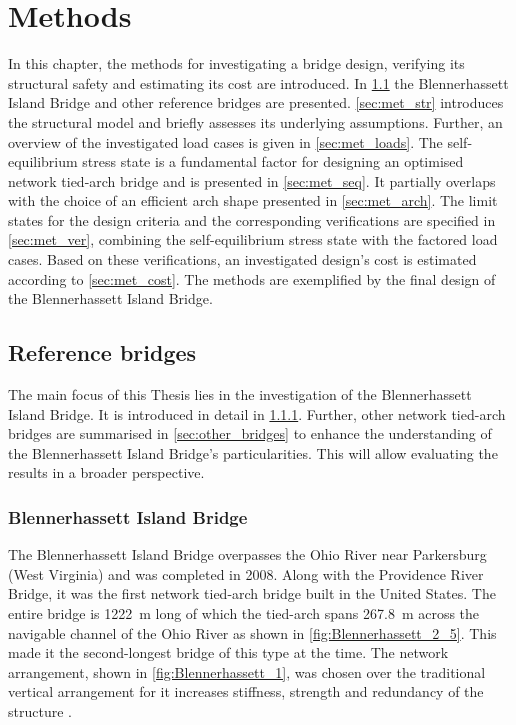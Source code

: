 \chapter{Methods}\label{sec:methods}
In this chapter, the methods for investigating a bridge design, verifying its structural safety and estimating its cost are introduced. In \cref{sec:met_ref} the Blennerhassett Island Bridge and other reference bridges are presented.
\cref{sec:met_str} introduces the structural model and briefly assesses its underlying assumptions. 
Further, an overview of the investigated load cases is given in \cref{sec:met_loads}. 
The self-equilibrium stress state is a fundamental factor for designing an optimised network tied-arch bridge and is presented in \cref{sec:met_seq}.
It partially overlaps with the choice of an efficient arch shape presented in \cref{sec:met_arch}.
The limit states for the design criteria and the corresponding verifications are specified in \cref{sec:met_ver}, combining the self-equilibrium stress state with the factored load cases. Based on these verifications, an investigated design's cost is estimated according to \cref{sec:met_cost}. The methods are exemplified by the final design of the Blennerhassett Island Bridge.

\section{Reference bridges} \label{sec:met_ref}
The main focus of this Thesis lies in the investigation of the Blennerhassett Island Bridge. It is introduced in detail in \cref{sec:Blennerhassett}. Further, other network tied-arch bridges are summarised in \cref{sec:other_bridges} to enhance the understanding of the Blennerhassett Island Bridge's particularities. This will allow evaluating the results in a broader perspective.
\subsection{Blennerhassett Island Bridge}\label{sec:Blennerhassett}
The Blennerhassett Island Bridge overpasses the Ohio River near Parkersburg (West Virginia) and was completed in 2008. Along with the Providence River Bridge, it was the first network tied-arch bridge built in the United States. The entire bridge is \SI{1222}{m} long of which the tied-arch spans \SI{267.8}{m} across the navigable channel of the Ohio River as shown in \cref{fig:Blennerhassett_2_5}. This made it the second-longest bridge of this type at the time. 
The network arrangement, shown in \cref{fig:Blennerhassett_1}, was chosen over the traditional vertical arrangement for it increases stiffness, strength and redundancy of the structure \cite{Wollmann}.

